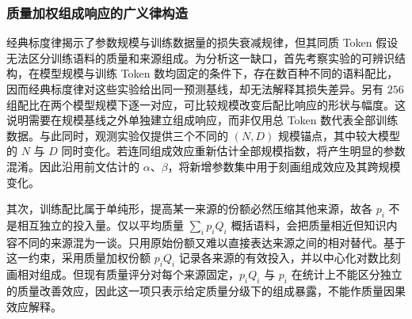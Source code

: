 \documentclass[bwprint]{gmcmthesis}
\begin{document}
\subsubsection{质量加权组成响应的广义律构造}

经典标度律揭示了参数规模与训练数据量的损失衰减规律，但其同质 Token 假设无法区分训练语料的质量和来源组成。为分析这一缺口，首先考察实验的可辨识结构，在模型规模与训练 Token 数均固定的条件下，存在数百种不同的语料配比，因而经典标度律对这些实验给出同一预测基线，却无法解释其损失差异。另有 $256$ 组配比在两个模型规模下逐一对应，可比较规模改变后配比响应的形状与幅度。这说明需要在规模基线之外单独建立组成响应，而非仅用总 Token 数代表全部训练数据。与此同时，观测实验仅提供三个不同的 $(N,D)$ 规模锚点，其中较大模型的 $N$ 与 $D$ 同时变化。若连同组成效应重新估计全部规模指数，将产生明显的参数混淆。因此沿用前文估计的 $\alpha$、$\beta$，将新增参数集中用于刻画组成效应及其跨规模变化。

其次，训练配比属于单纯形，提高某一来源的份额必然压缩其他来源，故各 $p_i$ 不是相互独立的投入量。仅以平均质量 $\sum_i p_iQ_i$ 概括语料，会把质量相近但知识内容不同的来源混为一谈。只用原始份额又难以直接表达来源之间的相对替代。基于这一约束，采用质量加权份额 $p_iQ_i$ 记录各来源的有效投入，并以中心化对数比刻画相对组成。但现有质量评分对每个来源固定，$p_iQ_i$ 与 $p_i$ 在统计上不能区分独立的质量改善效应，因此这一项只表示给定质量分级下的组成暴露，不能作质量因果效应解释。
\end{document}
